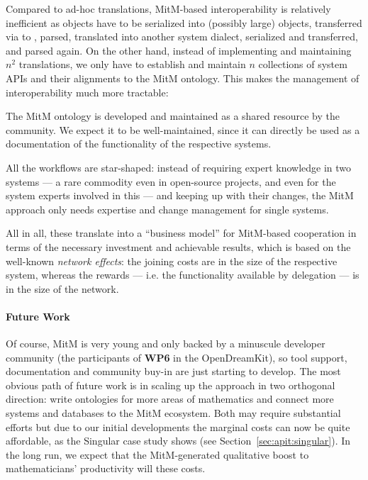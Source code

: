 Compared to ad-hoc translations, MitM-based interoperability is relatively inefficient as objects have to be serialized into (possibly large) \OMMT objects, transferred via \SCSCP to \MMT, parsed, translated into another system dialect, serialized and transferred, and parsed again.
On the other hand, instead of implementing and maintaining $n^2$ translations, we only have to establish and maintain $n$ collections of system APIs and their alignments to the
MitM ontology.
This makes the management of interoperability much more tractable:
\begin{compactenum}
\item The MitM ontology is developed and maintained as a shared resource by the community.
We expect it to be well-maintained, since it can directly be used as a documentation of the functionality of the respective systems.
\item All the workflows are star-shaped: instead of requiring expert knowledge in two systems --- a rare commodity even in open-source projects, and even for the system experts involved in this {\papertype} --- and keeping up with their changes, the MitM approach only needs expertise and change management for single systems.
\end{compactenum}
All in all, these translate into a ``business model'' for MitM-based cooperation in terms of the necessary investment and achievable results, which is based on the well-known \emph{network effects}: the joining costs are in the size of the respective system, whereas the rewards --- i.e. the functionality available by delegation --- is in the size of the network.

\paragraph{Future Work}
Of course, MitM is very young and only backed by a minuscule developer community (the participants of \textbf{WP6} in the OpenDreamKit), so tool support, documentation and community buy-in are just starting to develop.
The most obvious path of future work is in scaling up the approach in two orthogonal direction: write ontologies for more areas of mathematics and connect more systems and databases to the MitM ecosystem.
Both may require substantial efforts but due to our initial developments the marginal costs can now be quite affordable, as the Singular case study shows (see Section~\ref{sec:apit:singular}). 
In the long run, we expect that the MitM-generated qualitative boost to mathematicians' productivity will these costs.

